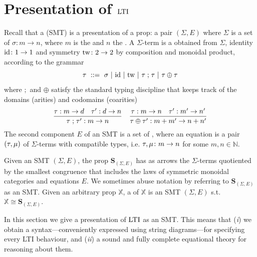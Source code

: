 \section{Presentation of $\operatorname{\mathrm{LTI}}$} \label{sec.diagrams}
Recall that a  (SMT) is a presentation of a prop: a pair
$(\Sigma,E)$ where $\Sigma$ is a set of  $\sigma\colon m\to
n$, where $m$ is the  and $n$ the . A
$\Sigma$-term is a obtained from $\Sigma$, identity $\mathrm{id}\colon 1\to 1$ and
symmetry $\mathrm{tw}\colon 2\to 2$ by composition and monoidal product, according to
the grammar
\[
  \tm\ ::=\ \sigma\ |\ \idn\ |\ \tw\ |\ \tm\mathrel{;}\tm\ |\ \tm\oplus \tm 
\]
where $\mathrel{;}$ and $\oplus$ satisfy the standard typing discipline that
keeps track of the domains (arities) and codomains (coarities)
\[
\frac{\tau: m\to d \quad \tau': d\to n}
{\tau\mathrel{;}\tau': m\to n}
\quad
\frac{\tau: m\to n \quad \tau': m'\to n'}
{\tau\oplus \tau': m+m'\to n+n'}
\]
The second component $E$ of an SMT is a set of , where an
equation is a pair $(\tau,\mu)$ of $\Sigma$-terms with compatible types, i.e.
$\tau,\mu\colon m\to n$ for some $m,n\in\mathbb{N}$.

Given an SMT $(\Sigma,E)$, the prop $\mathbf{S}_{(\Sigma,E)}$ has as arrows the
$\Sigma$-terms quotiented by the smallest congruence that includes the laws of
symmetric monoidal categories and equations $E$. We sometimes abuse
notation by referring to $\mathbf{S}_{(\Sigma,E)}$ as an SMT. Given an arbitrary
prop $\mathbb{X}$, a  of $\mathbb{X}$ is an SMT
$(\Sigma,E)$ s.t.\ $\mathbb{X} \cong \mathbf{S}_{(\Sigma,E)}$.

In this section we give a presentation of $\operatorname{\mathrm{LTI}}$ as an SMT. This means 
that (\emph{i}) we obtain a syntax---conveniently expressed using string
diagrams---for specifying every LTI behaviour, and (\emph{ii}) a sound and
fully complete equational theory for reasoning about them.

